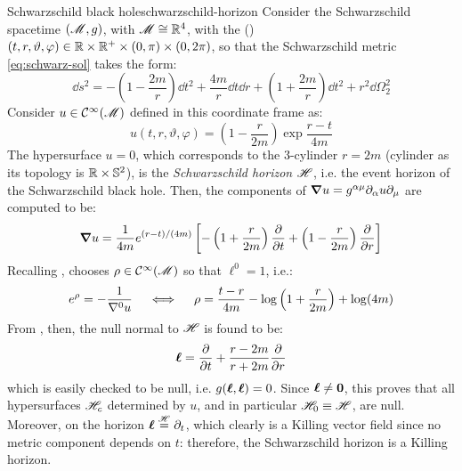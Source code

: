\begin{example}{Schwarzschild black hole}{schwarzschild-horizon}
  Consider the Schwarzschild spacetime $ (\mathscr{M} , g) $, with $ \mathscr{M} \cong \mathbb{R}^4 $, with the  () $ (t,r,\vartheta,\varphi) \in \mathbb{R} \times \mathbb{R}^+ \times (0,\pi) \times (0,2\pi) $, so that the Schwarzschild metric \ref{eq:schwarz-sol} takes the form:
  \begin{equation*}
    \dd s^2 = - \left( 1 - \frac{2m}{r} \right) \dd t^2 + \frac{4m}{r} \dd t \dd r + \left( 1 + \frac{2m}{r} \right) \dd t^2 + r^2 \dd \Omega_2^2
  \end{equation*}
  Consider $ u \in \mathcal{C}^{\infty}(\mathscr{M}) $ defined in this coordinate frame as:
  \begin{equation}
    u(t,r,\vartheta,\varphi) = \left( 1 - \frac{r}{2m} \right) \exp \frac{r - t}{4m}
  \end{equation}
  The hypersurface $ u = 0 $, which corresponds to the $ 3 $-cylinder $ r = 2m $ (cylinder as its topology is $ \mathbb{R} \times \mathbb{S}^{2} $), is the \emph{Schwarzschild horizon} $ \mathscr{H} $, i.e. the event horizon of the Schwarzschild black hole. Then, the components of $ \boldsymbol{\nabla} u = g^{\alpha \mu} \partial_\alpha u \partial_\mu $ are computed to be:
  \begin{equation*}
    \boldsymbol{\nabla} u = \frac{1}{4m} e^{(r - t)/(4m)} \left[ - \left( 1 + \frac{r}{2m} \right) \frac{\partial}{\partial t} + \left( 1 - \frac{r}{2m} \right) \frac{\partial}{\partial r} \right]
  \end{equation*}
  Recalling , chooses $ \rho \in \mathcal{C}^{\infty}(\mathscr{M}) $ so that $ \ell^0 = 1 $, i.e.:
  \begin{equation*}
    e^\rho = - \frac{1}{\nabla^0 u}
    \quad \iff \quad
    \rho = \frac{t - r}{4m} - \log \left( 1 + \frac{r}{2m} \right) + \log (4m)
  \end{equation*}
  From , then, the null normal to $ \mathscr{H} $ is found to be:
  \begin{equation}
    \boldsymbol{\ell} = \frac{\partial}{\partial t} + \frac{r - 2m}{r + 2m} \frac{\partial}{\partial r}
    \label{eq:schw-ll}
  \end{equation}
  which is easily checked to be null, i.e. $ g(\boldsymbol{\ell} , \boldsymbol{\ell}) = 0 $. Since $ \boldsymbol{\ell} \neq \boldsymbol{0} $, this proves that all hypersurfaces $ \mathscr{H}_c $ determined by $ u $, and in particular $ \mathscr{H}_0 \equiv \mathscr{H} $, are null. Moreover, on the horizon $ \boldsymbol{\ell} \overset{\mathscr{H}}{=} \partial_t $, which clearly is a Killing vector field since no metric component depends on $ t $: therefore, the Schwarzschild horizon is a Killing horizon.
\end{example}

